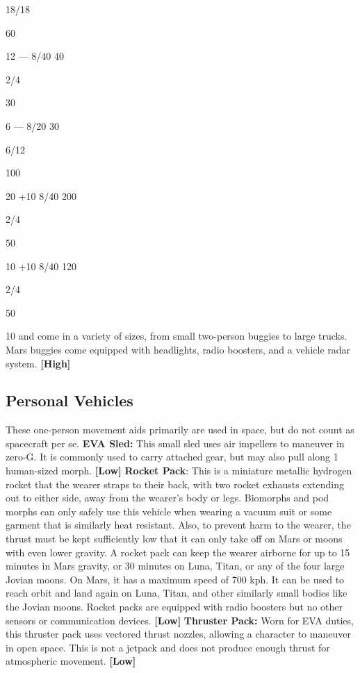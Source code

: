 18/18

60

12
—
8/40
40

2/4

30

6
—
8/20
30

6/12

100

20
+10
8/40
200

2/4

50

10
+10
8/40
120

2/4

50

10
and come in a variety of sizes, from small two-person 
buggies to large trucks. Mars buggies come equipped 
with headlights, radio boosters, and a vehicle radar 
system. \textbf{[High]}

\subsection{Personal Vehicles}

These one-person movement aids primarily are used in 
space, but do not count as spacecraft per se.
\textbf{EVA Sled:} This small sled uses air impellers to maneuver
in zero-G. It is commonly used to carry attached gear,
but may also pull along 1 human-sized morph. \textbf{[Low]}
\textbf{Rocket Pack}: This is a miniature metallic hydrogen 
rocket that the wearer straps to their back, with two 
rocket exhausts extending out to either side, away 
from the wearer's body or legs. Biomorphs and pod 
morphs can only safely use this vehicle when wearing
a vacuum suit or some garment that is similarly
heat resistant. Also, to prevent harm to the wearer, the 
thrust must be kept sufficiently low that it can only 
take off on Mars or moons with even lower gravity. A 
rocket pack can keep the wearer airborne for up to 15 
minutes in Mars gravity, or 30 minutes on Luna, Titan, 
or any of the four large Jovian moons. On Mars, it 
has a maximum speed of 700 kph. It can be used to 
reach orbit and land again on Luna, Titan, and other 
similarly small bodies like the Jovian moons. Rocket 
packs are equipped with radio boosters but no other 
sensors or communication devices. \textbf{[Low]}
\textbf{Thruster Pack:} Worn for EVA duties, this thruster 
pack uses vectored thrust nozzles, allowing a character
to maneuver in open space. This is not a jetpack
and does not produce enough thrust for atmospheric 
movement. \textbf{[Low]}

